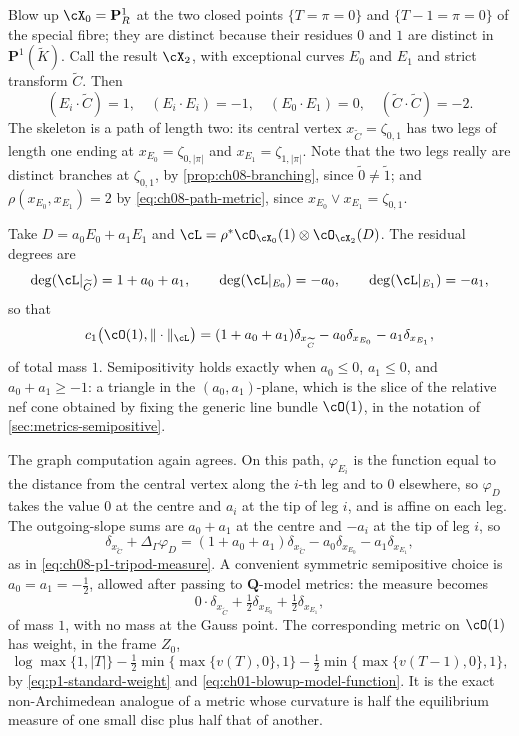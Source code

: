 \begin{example}
\label{ex:ch08-p1-tripod}
Blow up $\cX_0=\mathbf P^1_R$ at the two closed points
$\{T=\pi=0\}$ and $\{T-1=\pi=0\}$ of the special fibre; they are distinct
because their residues $0$ and $1$ are distinct in
$\mathbf P^1(\widetilde K)$.  Call the result $\cX_2$, with exceptional
curves $E_0$ and $E_1$
and strict transform $\widetilde C$.  Then
\[
 (E_i\cdot\widetilde C)=1,\quad (E_i\cdot E_i)=-1,\quad
 (E_0\cdot E_1)=0,\quad (\widetilde C\cdot\widetilde C)=-2 .
\]
The skeleton is a path of length two: its central vertex
$x_{\widetilde C}=\zeta_{0,1}$ has two legs of length one ending at
$x_{E_0}=\zeta_{0,|\pi|}$ and $x_{E_1}=\zeta_{1,|\pi|}$.  Note that the two
legs really are distinct branches at $\zeta_{0,1}$, by
\cref{prop:ch08-branching}, since $\widetilde0\neq\widetilde1$; and
$\rho(x_{E_0},x_{E_1})=2$ by \eqref{eq:ch08-path-metric}, since
$x_{E_0}\vee x_{E_1}=\zeta_{0,1}$.

Take $D=a_0E_0+a_1E_1$ and
$\cL=\rho^*\cO_{\cX_0}(1)\otimes\cO_{\cX_2}(D)$.  The residual degrees are
\[
 \deg(\cL|_{\widetilde C})=1+a_0+a_1,
 \qquad
 \deg(\cL|_{E_0})=-a_0,
 \qquad
 \deg(\cL|_{E_1})=-a_1 ,
\]
so that
\begin{equation}
\label{eq:ch08-p1-tripod-measure}
 c_1\bigl(\cO(1),\|\cdot\|_{\cL}\bigr)
 =(1+a_0+a_1)\delta_{x_{\widetilde C}}
  -a_0\delta_{x_{E_0}}-a_1\delta_{x_{E_1}} ,
\end{equation}
of total mass $1$.  Semipositivity holds exactly when $a_0\leq0$,
$a_1\leq0$, and $a_0+a_1\geq-1$: a triangle in the $(a_0,a_1)$-plane, which
is the slice of the relative nef cone obtained by fixing the generic
line bundle $\cO(1)$, in the notation of
\cref{sec:metrics-semipositive}.

The graph computation again agrees.  On this path, $\varphi_{E_i}$ is the
function equal to the distance from the central vertex along the $i$-th leg
and to $0$ elsewhere, so $\varphi_D$ takes the value $0$ at the centre and
$a_i$ at the tip of leg $i$, and is affine on each leg.  The outgoing-slope
sums are $a_0+a_1$ at the centre and $-a_i$ at the tip of leg $i$, so
\[
 \delta_{x_{\widetilde C}}+\Delta_\Gamma\varphi_D
 =(1+a_0+a_1)\delta_{x_{\widetilde C}}
   -a_0\delta_{x_{E_0}}-a_1\delta_{x_{E_1}} ,
\]
as in \eqref{eq:ch08-p1-tripod-measure}.  A convenient symmetric semipositive
choice is $a_0=a_1=-\tfrac12$, allowed after passing to
$\mathbf Q$-model metrics: the measure becomes
\[
 0\cdot\delta_{x_{\widetilde C}}
 +\tfrac12\delta_{x_{E_0}}+\tfrac12\delta_{x_{E_1}} ,
\]
of mass $1$, with no mass at the Gauss point.  The corresponding metric on
$\cO(1)$ has weight, in the frame $Z_0$,
\[
 \log\max\{1,|T|\}
   -\tfrac12\min\bigl\{\max\{v(T),0\},1\bigr\}
   -\tfrac12\min\bigl\{\max\{v(T-1),0\},1\bigr\},
\]
by \eqref{eq:p1-standard-weight} and
\eqref{eq:ch01-blowup-model-function}.  It is the exact non-Archimedean
analogue of a metric whose curvature is half the equilibrium measure of one
small disc plus half that of another.
\end{example}

